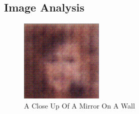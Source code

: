 \documentclass{article}%
\begin{document}
%
\subsection{Image Analysis}%
\label{subsec:ImageAnalysis}%


\begin{figure}[h!]%
\centering%
\includegraphics[width=150px]{500_fake_images/samples_5_226.png}%
\caption{A Close Up Of A Mirror On A Wall}%
\end{figure}

%
\end{document}
